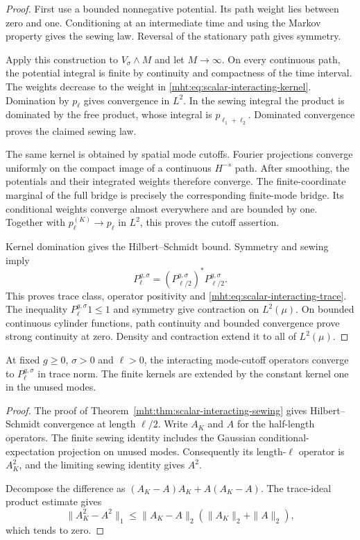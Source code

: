 \begin{proof}
First use a bounded nonnegative potential. Its path weight
lies between zero and one. Conditioning at an intermediate
time and using the Markov property gives the sewing law.
Reversal of the stationary path gives symmetry.

Apply this construction to $V_\sigma\wedge M$ and let
$M\to\infty$. On every continuous path, the potential
integral is finite by continuity and compactness of the time
interval. The weights decrease to the weight in
\eqref{mht:eq:scalar-interacting-kernel}.
Domination by $p_\ell$ gives convergence in $L^2$.
In the sewing integral the product is dominated by the free
product, whose integral is $p_{\ell_1+\ell_2}$.
Dominated convergence proves the claimed sewing law.

The same kernel is obtained by spatial mode cutoffs.
Fourier projections converge uniformly on the compact image
of a continuous $H^{-s}$ path. After smoothing, the potentials
and their integrated weights therefore converge.
The finite-coordinate marginal of the full bridge is precisely
the corresponding finite-mode bridge. Its conditional weights
converge almost everywhere and are bounded by one.
Together with $p_\ell^{(K)}\to p_\ell$ in $L^2$, this proves
the cutoff assertion.

Kernel domination gives the Hilbert--Schmidt bound.
Symmetry and sewing imply
\[
 P_\ell^{g,\sigma}
       =(P_{\ell/2}^{g,\sigma})^*P_{\ell/2}^{g,\sigma}.
\]
This proves trace class, operator positivity and
\eqref{mht:eq:scalar-interacting-trace}.
The inequality $P_\ell^{g,\sigma}1\leq1$ and symmetry give
contraction on $L^2(\mu)$.
On bounded continuous cylinder functions, path continuity
and bounded convergence prove strong continuity at zero.
Density and contraction extend it to all of $L^2(\mu)$.
\end{proof}

\begin{corollary}\label{mht:cor:scalar-trace-convergence}
At fixed $g\geq0$, $\sigma>0$ and $\ell>0$, the interacting
mode-cutoff operators converge to $P_\ell^{g,\sigma}$ in trace norm.
The finite kernels are extended by the constant kernel one in
the unused modes.
\end{corollary}

\begin{proof}
The proof of Theorem~\ref{mht:thm:scalar-interacting-sewing}
gives Hilbert--Schmidt convergence at length $\ell/2$.
Write $A_K$ and $A$ for the half-length operators.
The finite sewing identity includes the Gaussian
conditional-expectation projection on unused modes.
Consequently its length-$\ell$ operator is $A_K^2$,
and the limiting sewing identity gives $A^2$.

Decompose the difference as
$(A_K-A)A_K+A(A_K-A)$.
The trace-ideal product estimate gives
\[
 \|A_K^2-A^2\|_1
 \leq\|A_K-A\|_2(\|A_K\|_2+\|A\|_2),
\]
which tends to zero.
\end{proof}

